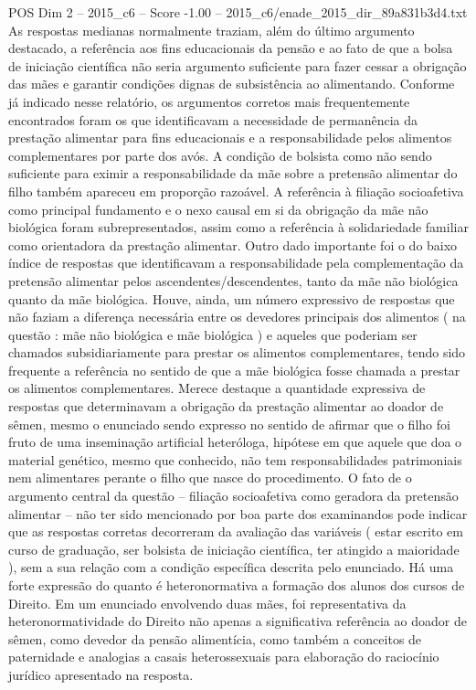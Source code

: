 \begin{textsample}{POS Dim 2 – 2015\_c6 – Score -1.00 – 2015\_c6/enade\_2015\_dir\_89a831b3d4.txt}
As respostas medianas normalmente traziam, além do último argumento destacado, a referência aos fins educacionais da pensão e ao fato de que a bolsa de iniciação científica não seria argumento suficiente para fazer cessar a obrigação das mães e garantir condições dignas de subsistência ao alimentando.
Conforme já indicado nesse relatório, os argumentos corretos mais frequentemente encontrados foram os que identificavam a necessidade de permanência da prestação alimentar para fins educacionais e a responsabilidade pelos alimentos complementares por parte dos avós.
A condição de bolsista como não sendo suficiente para eximir a responsabilidade da mãe sobre a pretensão alimentar do filho também apareceu em proporção razoável.
A referência à filiação socioafetiva como principal fundamento e o nexo causal em si da obrigação da mãe não biológica foram subrepresentados, assim como a referência à solidariedade familiar como orientadora da prestação alimentar.
Outro dado importante foi o do baixo índice de respostas que identificavam a responsabilidade pela complementação da pretensão alimentar pelos ascendentes/descendentes, tanto da mãe não biológica quanto da mãe biológica.
Houve, ainda, um número expressivo de respostas que não faziam a diferença necessária entre os devedores principais dos alimentos ( na questão : mãe não biológica e mãe biológica ) e aqueles que poderiam ser chamados subsidiariamente para prestar os alimentos complementares, tendo sido frequente a referência no sentido de que a mãe biológica fosse chamada a prestar os alimentos complementares.
Merece destaque a quantidade expressiva de respostas que determinavam a obrigação da prestação alimentar ao doador de sêmen, mesmo o enunciado sendo expresso no sentido de afirmar que o filho foi fruto de uma inseminação artificial heteróloga, hipótese em que aquele que doa o material genético, mesmo que conhecido, não tem responsabilidades patrimoniais nem alimentares perante o filho que nasce do procedimento.
O fato de o argumento central da questão – filiação socioafetiva como geradora da pretensão alimentar – não ter sido mencionado por boa parte dos examinandos pode indicar que as respostas corretas decorreram da avaliação das variáveis ( estar escrito em curso de graduação, ser bolsista de iniciação científica, ter atingido a maioridade ), sem a sua relação com a condição específica descrita pelo enunciado.
Há uma forte expressão do quanto é heteronormativa a formação dos alunos dos cursos de Direito.
Em um enunciado envolvendo duas mães, foi representativa da heteronormatividade do Direito não apenas a significativa referência ao doador de sêmen, como devedor da pensão alimentícia, como também a conceitos de paternidade e analogias a casais heterossexuais para elaboração do raciocínio jurídico apresentado na resposta.

\end{textsample}
